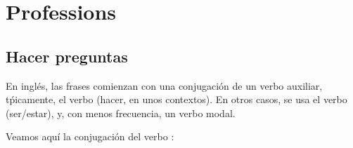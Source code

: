\chapter{Professions}

\section{Hacer preguntas}%
\label{sec:Hacer preguntas}

En ingl\'es, las frases comienzan con una conjugaci\'on de un verbo auxiliar, t\'picamente, el verbo  (hacer, en unos contextos).
En otros casos, se usa el verbo  (ser/estar), y, con menos frecuencia, un verbo modal.

Veamos aqu\'i la conjugaci\'on del verbo :
